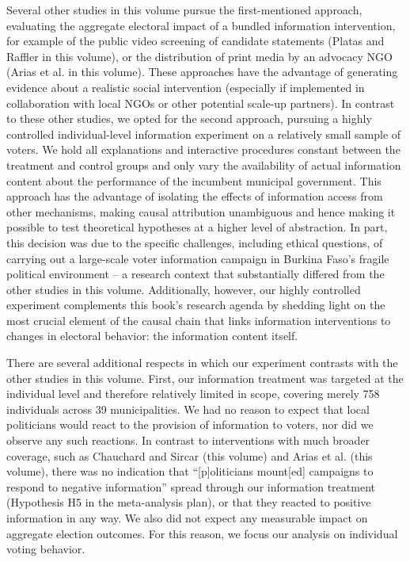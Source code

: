 \documentclass[11pt]{article}
\begin{document}
Several other studies in this volume pursue the first-mentioned approach, evaluating the aggregate electoral impact of a bundled information intervention, for example of the public video screening of candidate statements (Platas and Raffler in this volume), or the distribution of print media by an advocacy NGO (Arias et al. in this volume). These approaches have the advantage of generating evidence about a realistic social intervention (especially if implemented in collaboration with local NGOs or other potential scale-up partners). In contrast to these other studies, we opted for the second approach, pursuing a highly controlled individual-level information experiment on a relatively small sample of voters. We hold all explanations and interactive procedures constant between the treatment and control groups and only vary the availability of actual information content about the performance of the incumbent municipal government. This approach has the advantage of isolating the effects of information access from other mechanisms, making causal attribution unambiguous and hence making it possible to test theoretical hypotheses at a higher level of abstraction. In part, this decision was due to the specific challenges, including ethical questions, of carrying out a large-scale voter information campaign in Burkina Faso's fragile political environment -- a research context that substantially differed from the other studies in this volume. Additionally, however, our highly controlled experiment complements this book's research agenda by shedding light on the most crucial element of the causal chain that links information interventions to changes in electoral behavior: the information content itself. 

There are several additional respects in which our experiment contrasts with the other studies in this volume. 
First, our information treatment was targeted at the individual level and therefore relatively limited in scope, covering merely 758 individuals across 39 municipalities. We had no reason to expect that local politicians would react to the provision of information to voters, nor did we observe any such reactions. In contrast to interventions with much broader coverage, such as Chauchard and Sircar (this volume) and Arias et al. (this volume), there was no indication that ``[p]oliticians mount[ed] campaigns to respond to negative information'' spread through our information treatment (Hypothesis H5 in the meta-analysis plan), or that they reacted to positive information in any way. We also did not expect any measurable impact on aggregate election outcomes. For this reason, we focus our analysis on individual voting behavior. 
\end{document}

